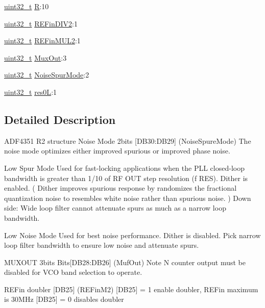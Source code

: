 \begin{DoxyCompactItemize}
\item 
\hyperlink{send_8c_a435d1572bf3f880d55459d9805097f62}{uint32\+\_\+t} \hyperlink{structr2__t_a0abc2956b7cbc989552c17264973d24d}{R}\+:10
\item 
\hyperlink{send_8c_a435d1572bf3f880d55459d9805097f62}{uint32\+\_\+t} \hyperlink{structr2__t_aa036b7abbb6147e0c155101addc1490c}{R\+E\+Fin\+D\+I\+V2}\+:1
\item 
\hyperlink{send_8c_a435d1572bf3f880d55459d9805097f62}{uint32\+\_\+t} \hyperlink{structr2__t_aa675f6a674217e14be9e3e1754530a78}{R\+E\+Fin\+M\+U\+L2}\+:1
\item 
\hyperlink{send_8c_a435d1572bf3f880d55459d9805097f62}{uint32\+\_\+t} \hyperlink{structr2__t_a284292bd7e449b3c4641639ed6826310}{Mux\+Out}\+:3
\item 
\hyperlink{send_8c_a435d1572bf3f880d55459d9805097f62}{uint32\+\_\+t} \hyperlink{structr2__t_a40bc8b8cb7d9e77e57abd0e8be4f01af}{Noise\+Spur\+Mode}\+:2
\item 
\hyperlink{send_8c_a435d1572bf3f880d55459d9805097f62}{uint32\+\_\+t} \hyperlink{structr2__t_af67e412a4c526894fee5ce321dfce083}{res0L}\+:1
\end{DoxyCompactItemize}


\subsection{Detailed Description}
A\+D\+F4351 R2 structure Noise Mode 2bits \mbox{[}D\+B30\+:D\+B29\mbox{]} (Noise\+Spure\+Mode) The noise mode optimizes either improved spurious or improved phase noise. 

Low Spur Mode Used for fast-\/locking applications when the P\+LL closed-\/loop bandwidth is greater than 1/10 of RF O\+UT step resolution (f R\+ES). Dither is enabled. ( Dither improves spurious response by randomizes the fractional quantization noise to resembles white noise rather than spurious noise. ) Down side\+: Wide loop filter cannot attenuate spurs as much as a narrow loop bandwidth.

Low Noise Mode Used for best noise performance. Dither is disabled. Pick narrow loop filter bandwidth to ensure low noise and attenuate spurs.

M\+U\+X\+O\+UT 3bits Bits\mbox{[}D\+B28\+:D\+B26\mbox{]} (Muf\+Out) Note N counter output must be disabled for V\+CO band selection to operate.

R\+E\+Fin doubler \mbox{[}D\+B25\mbox{]} (R\+E\+Fin\+M2) \mbox{[}D\+B25\mbox{]} = 1 enable doubler, R\+E\+Fin maximum is 30\+M\+Hz \mbox{[}D\+B25\mbox{]} = 0 disables doubler

